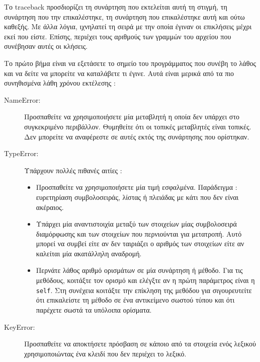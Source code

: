 \documentclass[10pt]{book}
\begin{document}
 Το  traceback  προσδιορίζει τη συνάρτηση που εκτελείται αυτή τη στιγμή,  τη συνάρτηση που την επικαλέστηκε, τη συνάρτηση που επικαλέστηκε αυτή και ούτω καθεξής.  Με άλλα λόγια, ιχνηλατεί τη σειρά με την οποία έγιναν οι επικλήσεις μέχρι εκεί που είστε.  Επίσης, περιέχει τους αριθμούς των γραμμών του αρχείου που  συνέβησαν αυτές οι κλήσεις.

Το πρώτο βήμα είναι να εξετάσετε το σημείο του προγράμματος που συνέβη το λάθος και να δείτε να μπορείτε να καταλάβετε τι έγινε.  Αυτά είναι μερικά από τα πιο συνηθισμένα λάθη χρόνου εκτέλεσης :

\begin{description}

\item[NameError:]  Προσπαθείτε να χρησιμοποιήσετε μία μεταβλητή η οποία δεν υπάρχει στο συγκεκριμένο περιβάλλον.  Θυμηθείτε ότι οι τοπικές μεταβλητές είναι τοπικές.  Δεν μπορείτε να αναφέρεστε σε αυτές εκτός της συνάρτησης που ορίστηκαν. 

\item[TypeError:]  Υπάρχουν πολλές πιθανές αιτίες : 

\begin{itemize}

\item  Προσπαθείτε να χρησιμοποιήσετε μία τιμή εσφαλμένα.  Παράδειγμα :  
ευρετηρίαση συμβολοσειράς, λίστας ή πλειάδας με κάτι που δεν είναι ακέραιος.

\item Υπάρχει μία αναντιστοιχία μεταξύ των στοιχείων μίας συμβολοσειρά διαμόρφωσης 
και των στοιχείων που περνιούνται για μετατροπή.  Αυτό μπορεί να συμβεί είτε αν δεν ταιριάζει ο αριθμός των στοιχείων είτε αν καλείται μία ακατάλληλη αναδρομή.

\item Περνάτε λάθος αριθμό ορισμάτων σε μία συνάρτηση ή μέθοδο.  
Για τις μεθόδους, κοιτάξτε τον ορισμό και ελέγξτε αν η πρώτη παράμετρος είναι η 
 {\tt self}.   Στη συνέχεια κοιτάξτε την επίκληση της μεθόδου για σιγουρευτείτε ότι επικαλείστε τη μέθοδο σε ένα αντικείμενο σωστού τύπου και ότι  παρέχετε σωστά τα υπόλοιπα ορίσματα.

\end{itemize}
 

\item[KeyError:]   Προσπαθείτε να αποκτήσετε πρόσβαση σε κάποιο από τα στοιχεία ενός λεξικού χρησιμοποιώντας ένα κλειδί που δεν περιέχει το λεξικό. 


\end{description}
\end{document}
